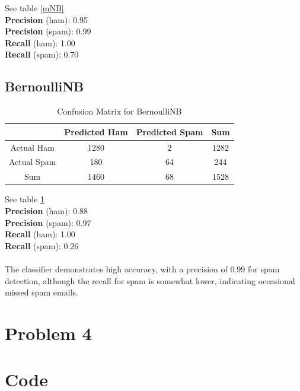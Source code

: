 \documentclass[a4paper]{article}
\begin{document}
See table \ref{mNB}\\
\textbf{Precision} (ham): 0.95 \\
\textbf{Precision} (spam): 0.99 \\
\textbf{Recall} (ham): 1.00 \\
\textbf{Recall} (spam): 0.70

\subsection*{BernoulliNB}
\begin{table}[h!]
	\centering
	\begin{tabular}{|c|c|c|c|}
		\hline
		& Predicted Ham & Predicted Spam & Sum \\
		\hline
		Actual Ham & 1280 & 2 & 1282 \\
		\hline
		Actual Spam & 180 & 64 & 244 \\
		\hline
		Sum & 1460 & 68 & 1528 \\
		\hline
	\end{tabular}
	\caption{Confusion Matrix for BernoulliNB}
	\label{bNB}
\end{table}
\noindent
See table \ref{bNB}\\
\textbf{Precision} (ham): 0.88 \\
\textbf{Precision} (spam): 0.97 \\
\textbf{Recall} (ham): 1.00 \\
\textbf{Recall} (spam): 0.26\\\\
The classifier demonstrates high accuracy, with a precision of 0.99 for spam detection, although the recall for spam is somewhat lower, indicating occasional missed spam emails.

\section*{Problem 4}

\printbibliography
\appendix

\section*{Code}
\label{app:excode}

\begin{lstlisting}

\end{lstlisting}
\end{document}
